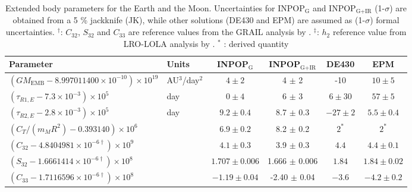 \documentclass[fleqn,usenatbib,referee]{mnras}
\begin{document}
\begin{table*}
    \caption{Extended body parameters for the Earth and the Moon. Uncertainties for INPOP$_{\textrm{G}}$  and INPOP$_{\textrm{G+IR}}$ (1-$\sigma$) are obtained from a 5 \% jackknife (JK), while other solutions (DE430 and EPM) are assumed as (1-$\sigma$) formal uncertainties. $^\dag$: $C_{32}$, $S_{32}$ and $C_{33}$ are reference values from the GRAIL analysis by \protect\cite{Konopliv2013}. $^\ddag$: $h_2$ reference value from LRO-LOLA analysis by \protect\cite{Mazarico2014}. $^{*}$ : derived quantity}
    \label{est_extMoon}
    \begin{tabular}{llcccc}
           \hline
           \textbf{Parameter}                                       & \textbf{Units}    & \textbf{INPOP$_{\textrm{G}}$}     & \textbf{INPOP$_{\textrm{G+IR}}$} & \textbf{DE430}    & \textbf{EPM}    \\ \midrule 
           $(GM_{\textrm{EMB}}-8.997011400 \times 10^{-10}) \times 10^{19} $ & AU$^3$/day$^2$    & $4 \pm 2$                         & 4 $\pm$ 2                        & -10               & $10 \pm 5$      \\ 
           $(\tau_{R1,E} - 7.3\times 10^{-3}) \times 10^{5}$        & day               & $0 \pm 4$                         & 6 $\pm$ 3                        & $6 \pm 30$        & $57 \pm 5$      \\ 
           $(\tau_{R2,E}-2.8\times 10^{-3}) \times 10^{5}$          & day               & $9.2 \pm 0.4$                     & 8.7 $\pm$ 0.3                    & $-27 \pm 2$       & $5.5 \pm 0.4$   \\ 
           $(C_{T}/(m_{M}R^2)- 0.393140) \times 10^{6}$             &                   & $6.9 \pm 0.2$                     & 8.2 $\pm$ 0.2                    & $2^{*} $          & $2^{*} $  \\ 
           $(C_{32} - 4.8404981\times 10^{-6 \dag}) \times 10^{9}$  &                   & $4.1 \pm 0.3$                     & 3.9 $\pm$ 0.3                    & $4.4 $            & $4.4\pm 0.1$    \\ 
           $(S_{32} - 1.6661414\times 10^{-6 \dag}) \times 10^{8}$  &                   & $1.707 \pm 0.006$                 & 1.666 $\pm$ 0.006                & $1.84 $           & $1.84\pm 0.02$  \\ 
           $(C_{33} - 1.7116596\times 10^{-6 \dag}) \times 10^{8}$  &                   & $-1.19 \pm 0.04$                  & -2.40 $\pm$ 0.04                 & $-3.6 $           & $-4.2 \pm 0.2$  \\ 

\end{tabular}
\end{table*}
\end{document}
